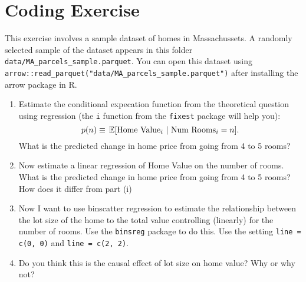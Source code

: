 \documentclass[12pt]{article}
\begin{document}
\section*{Coding Exercise}

This exercise involves a sample dataset of homes in Massachussets. A randomly selected sample of the dataset appears in this folder \texttt{data/MA\_parcels\_sample.parquet}. You can open this dataset using \texttt{arrow::read\_parquet("data/MA\_parcels\_sample.parquet")} after installing the arrow package in R. 

\begin{enumerate}
  \item Estimate the conditional expecation function from the theoretical question using regression (the \texttt{i} function from the \texttt{fixest} package will help you): $$
    p(n) \equiv \expec{\text{Home Value}_i}{\text{Num Rooms}_i = n}.
  $$
  What is the predicted change in home price from going from 4 to 5 rooms?

  \item Now estimate a linear regression of Home Value on the number of rooms. What is the predicted change in home price from going from 4 to 5 rooms? How does it differ from part (i)
  
  \item Now I want to use binscatter regression to estimate the relationship between the lot size of the home to the total value controlling (linearly) for the number of rooms. Use the \texttt{binsreg} package to do this. Use the setting \texttt{line = c(0, 0)} and \texttt{line = c(2, 2)}. 
  
  \item Do you think this is the causal effect of lot size on home value? Why or why not?
\end{enumerate}
\end{document}
